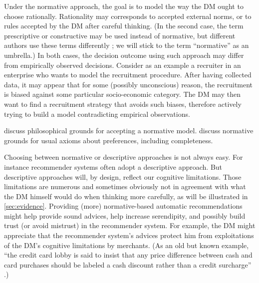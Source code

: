 \documentclass[french, english]{llncs}
\begin{document}
Under the normative approach, the goal is to model the way the \ac{DM} ought to choose rationally. Rationality may corresponds to accepted external norms, or to rules accepted by the \ac{DM} after careful thinking. (In the second case, the term prescriptive or constructive may be used instead of normative, but different authors use these terms differently \citep{roy_decision_1993, tsoukias_concept_2007}; we will stick to the term “normative” as an umbrella.) In both cases, the decision outcome using such approach may differ from empirically observed decisions. Consider as an example a recruiter in an enterprise who wants to model the recruitment procedure. After having collected data, it may appear that for some (possibly unconscious) reason, the recruitment is biased against some particular socio-economic category. The \ac{DM} may then want to find a recruitment strategy that avoids such biases, therefore actively trying to build a model contradicting empirical observations. 
	
\citet{mcclennen_rationality_1990, guala_logic_2000} discuss philosophical grounds for accepting a normative model. \citet{anand_are_1987, mandler_difficult_2001} discuss normative grounds for usual axioms about preferences, including completeness.

Choosing between normative or descriptive approaches is not always easy. For instance recommender systems often adopt a descriptive approach. 
But descriptive approaches will, by design, reflect our cognitive limitations. Those limitations are numerous and sometimes obviously not in agreement with what the \ac{DM} himself would do when thinking more carefully, as will be illustrated in \cref{sec:evidence}. 
Providing (more) normative-based automatic recommendations might help provide sound advices, help increase serendipity, and possibly build trust (or avoid mistrust) in the recommender system. For example, the \ac{DM} might appreciate that the recommender system’s advices protect him from exploitations of the \ac{DM}’s cognitive limitations by merchants. (As an old but known example, “the credit card lobby is said to insist that any price difference between cash and card purchases should be labeled a cash discount rather than a credit surcharge” \citep{tversky_rational_1986}.) 
	
\end{document}
